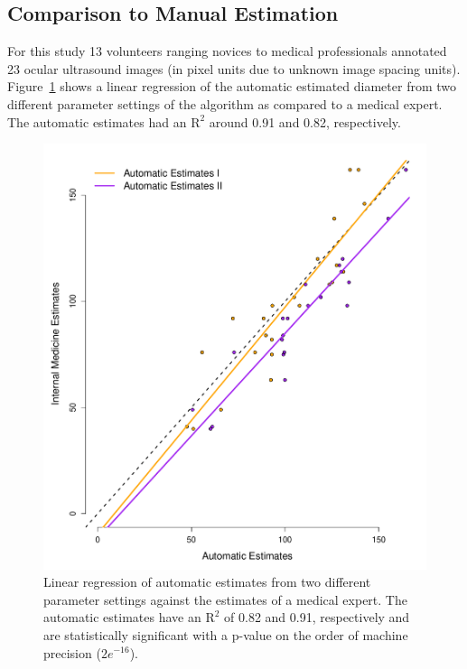 \documentclass{llncs}
\begin{document}
\subsection{Comparison to Manual Estimation}
For this study 13 volunteers ranging novices to medical professionals annotated
23 ocular ultrasound images (in pixel units due to unknown image spacing units).
Figure~\ref{fig:regression} shows a linear regression of the automatic estimated
diameter from two different parameter settings of the algorithm as compared to a
medical expert. The automatic estimates had an $\textrm{R}^2$ around 0.91 and
0.82, respectively. 
\begin{figure}
\centering
\includegraphics[width=0.65\linewidth]{linear-fit.pdf} 
\caption{
\label{fig:regression}
Linear regression of automatic estimates from two different parameter settings
against the estimates of a medical expert. The automatic estimates have an
$\mathrm{R}^2$
of 0.82 and 0.91, respectively and are statistically significant with a p-value
on the order of machine precision ($2e^{-16}$).
}
\end{figure}
\end{document}
